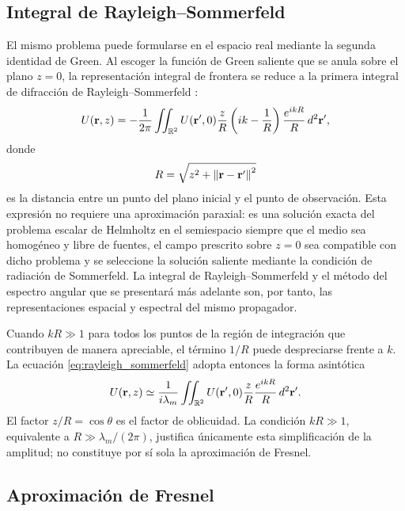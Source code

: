 \subsection{Integral de Rayleigh--Sommerfeld}

El mismo problema puede formularse en el espacio real mediante la segunda
identidad de Green. Al escoger la función de Green saliente que se anula sobre
el plano \(z=0\), la representación integral de frontera se reduce a la
primera integral de difracción de Rayleigh--Sommerfeld \cite{goodman2005}:
\begin{equation}
U(\vb r,z)
=
-\frac{1}{2\pi}
\iint_{\mathbb R^2}
U(\vb r',0)
\frac{z}{R}
\left(ik-\frac{1}{R}\right)
\frac{e^{ikR}}{R}\,
d^2\vb r',
\label{eq:rayleigh_sommerfeld}
\end{equation}
donde
\begin{equation}
R=
\sqrt{
z^2+
\left\lVert
\vb r-\vb r'
\right\rVert^2
}
\end{equation}
es la distancia entre un punto del plano inicial y el punto de observación.
Esta expresión no requiere una aproximación paraxial: es una solución exacta
del problema escalar de Helmholtz en el semiespacio siempre que el medio sea
homogéneo y libre de fuentes, el campo prescrito sobre \(z=0\) sea compatible
con dicho problema y se seleccione la solución saliente mediante la condición
de radiación de Sommerfeld. La integral de Rayleigh--Sommerfeld y el método
del espectro angular que se presentará más adelante son, por tanto, las
representaciones espacial y espectral del mismo propagador.

Cuando \(kR\gg1\) para todos los puntos de la región de integración que
contribuyen de manera apreciable, el término \(1/R\) puede despreciarse frente
a \(k\). La ecuación \eqref{eq:rayleigh_sommerfeld} adopta entonces la forma
asintótica
\begin{equation}
U(\vb r,z)
\simeq
\frac{1}{i\lambda_m}
\iint_{\mathbb R^2}
U(\vb r',0)
\frac{z}{R}
\frac{e^{ikR}}{R}\,
d^2\vb r'.
\label{eq:rayleigh_sommerfeld_asymptotic}
\end{equation}
El factor \(z/R=\cos\theta\) es el factor de oblicuidad. La condición
\(kR\gg1\), equivalente a \(R\gg\lambda_m/(2\pi)\), justifica únicamente esta
simplificación de la amplitud; no constituye por sí sola la aproximación de
Fresnel.

\subsection{Aproximación de Fresnel}

